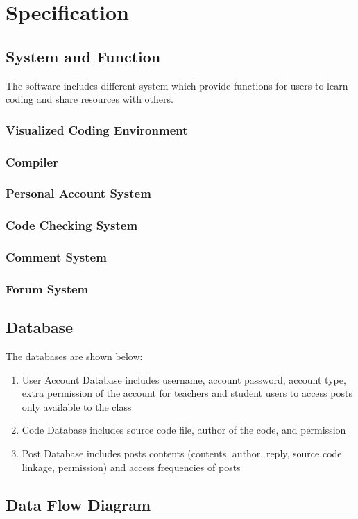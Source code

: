 \chapter{Specification}
\section{System and Function}
The software includes different system which provide functions for users to learn coding and share resources with others.
\subsection{Visualized Coding Environment}
	
\subsection{Compiler}
\subsection{Personal Account System}
	
\subsection{Code Checking System}
	
\subsection{Comment System}
	
\subsection{Forum System}
	
\section{Database}
The databases are shown below:
\begin{enumerate}
	\item User Account Database includes username, account password, account type, extra permission of the account for teachers and student users to access posts only available to the class
	\item Code Database includes source code file, author of the code, and permission
	\item Post Database includes posts contents (contents, author, reply, source code linkage, permission) and access frequencies of posts
\end{enumerate}
\section{Data Flow Diagram}
